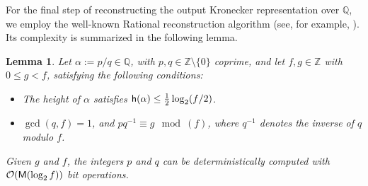 \documentclass[pdflatex,sn-basic]{sn-jnl}%
\theoremstyle{thmstyleone}%
\theoremstyle{thmstyletwo}%
\theoremstyle{thmstylethree}%
\newtheorem{lemma}[theorem]{Lemma}
\theoremstyle{definition}
\numberwithin{equation}{section}
\newcommand{\Z}{\mathbb Z}
\newcommand{\Q}{\mathbb Q}
\begin{document}
For the final step of reconstructing the output Kronecker
representation over $\Q$, we employ the well-known {\sf Rational
reconstruction} algorithm (see, for example, \cite[\S
5.10]{GaGe99}). Its complexity is summarized in the following lemma.
%
\begin{lemma}\label{lemma: rational_reconstruction_algorithm}
Let $\alpha:=p/q\in\Q$, with $p,q\in\Z\setminus\{0\}$ coprime, and
let $f,g\in \mathbb{Z}$ with $0\leq g< f$, satisfying the following
conditions:
\begin{itemize}
  \item The height of $\alpha$ satisfies ${\sf h}(\alpha)\le \frac{1}{2}\log_2(f/2)$.
  \item $\gcd (q,f)=1$, and $pq^{-1}\equiv g \mod (f)$, where $q^{-1}$ denotes the inverse of $q$ modulo $f$.
\end{itemize}
Given $g$ and $f$, the integers $p$ and $q$ can be deterministically
computed with $\mathcal{O}({\sf M}(\log_2f))$ bit operations.
\end{lemma}
\end{document}
